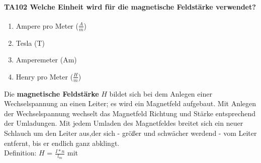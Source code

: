 \documentclass[8pt]{article}
\begin{document}
\paragraph*{TA102 Welche Einheit wird für die magnetische Feldstärke verwendet?}
\begin{enumerate}[nolistsep,label=\Alph*]
\item Ampere pro Meter ($\frac{A}{m}$)
\item Tesla (T)
\item Amperemeter (Am)
\item Henry pro Meter ($\frac{H}{m}$)
\end{enumerate}
Die \textbf{magnetische Feldstärke} $H$ bildet sich bei dem Anlegen einer Wechselspannung an einen Leiter; es wird ein Magnetfeld aufgebaut. Mit Anlegen der Wechselspannung wechselt das Magnetfeld Richtung und Stärke entsprechend der Umladungen. Mit jedem Umladen des Magnetfeldes breitet sich ein neuer Schlauch um den Leiter aus,der sich - größer und schwächer werdend - vom Leiter entfernt, bis er endlich ganz abklingt.\\
Definition: $H$ = $\frac{I * n}{l_{m}}$ mit
\end{document}
